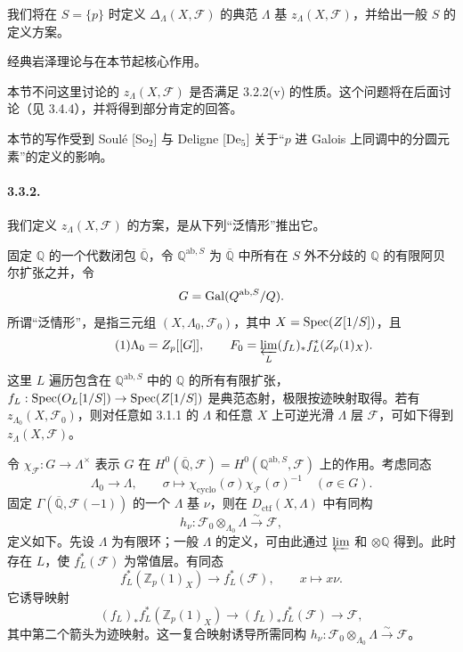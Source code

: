 我们将在 $S=\{p\}$ 时定义 $\Delta_\Lambda(X,\mathcal F)$ 的典范 $\Lambda$ 基 $z_\Lambda(X,\mathcal F)$，并给出一般 $S$ 的定义方案。

经典岩泽理论与在本节起核心作用。

本节不问这里讨论的 $z_\Lambda(X,\mathcal F)$ 是否满足 3.2.2(v) 的性质。这个问题将在后面讨论（见 3.4.4），并将得到部分肯定的回答。

本节的写作受到 Soulé [So$_2$] 与 Deligne [De$_5$] 关于“$p$ 进 Galois 上同调中的分圆元素”的定义的影响。

\paragraph{3.3.2.} 我们定义 $z_\Lambda(X,\mathcal F)$ 的方案，是从下列“泛情形”推出它。

固定 $\mathbb Q$ 的一个代数闭包 $\overline{\mathbb Q}$，令 $\mathbb Q^{\mathrm{ab},S}$ 为 $\overline{\mathbb Q}$ 中所有在 $S$ 外不分歧的 $\mathbb Q$ 的有限阿贝尔扩张之并，令
\[
 G=\Gal(\mathbb Q^{\mathrm{ab},S}/\mathbb Q).
\]
所谓“泛情形”，是指三元组 $(X,\Lambda_0,\mathcal F_0)$，其中 $X=\Spec(\mathbb Z[1/S])$，且
\begin{equation*}\tag{1}
 \Lambda_0=\mathbb Z_p[[G]],\qquad
 \mathcal F_0=\varprojlim_L(f_L)_*f_L^*(\mathbb Z_p(1)_X).
\end{equation*}
这里 $L$ 遍历包含在 $\mathbb Q^{\mathrm{ab},S}$ 中的 $\mathbb Q$ 的所有有限扩张，$f_L:\Spec(\mathcal O_L[1/S])\to\Spec(\mathbb Z[1/S])$ 是典范态射，极限按迹映射取得。若有 $z_{\Lambda_0}(X,\mathcal F_0)$，则对任意如 3.1.1 的 $\Lambda$ 和任意 $X$ 上可逆光滑 $\Lambda$ 层 $\mathcal F$，可如下得到 $z_\Lambda(X,\mathcal F)$。

令 $\chi_{\mathcal F}:G\to\Lambda^\times$ 表示 $G$ 在 $H^0(\overline{\mathbb Q},\mathcal F)=H^0(\mathbb Q^{\mathrm{ab},S},\mathcal F)$ 上的作用。考虑同态
\[
 \Lambda_0\longrightarrow\Lambda,\qquad
 \sigma\longmapsto\chi_{\mathrm{cyclo}}(\sigma)\chi_{\mathcal F}(\sigma)^{-1}
 \quad(\sigma\in G).
\]
固定 $\Gamma(\overline{\mathbb Q},\mathcal F(-1))$ 的一个 $\Lambda$ 基 $\nu$，则在 $D_{\mathrm{ctf}}(X,\Lambda)$ 中有同构
\[
 h_\nu:\mathcal F_0\otimes_{\Lambda_0}\Lambda\xrightarrow{\sim}\mathcal F,
\]
定义如下。先设 $\Lambda$ 为有限环；一般 $\Lambda$ 的定义，可由此通过 $\varprojlim$ 和 $\otimes\mathbb Q$ 得到。此时存在 $L$，使 $f_L^*(\mathcal F)$ 为常值层。有同态
\[
 f_L^*(\mathbb Z_p(1)_X)\longrightarrow f_L^*(\mathcal F),\qquad x\longmapsto x\nu.
\]
它诱导映射
\[
 (f_L)_*f_L^*(\mathbb Z_p(1)_X)\longrightarrow(f_L)_*f_L^*(\mathcal F)
 \longrightarrow\mathcal F,
\]
其中第二个箭头为迹映射。这一复合映射诱导所需同构 $h_\nu:\mathcal F_0\otimes_{\Lambda_0}\Lambda\xrightarrow{\sim}\mathcal F$。

